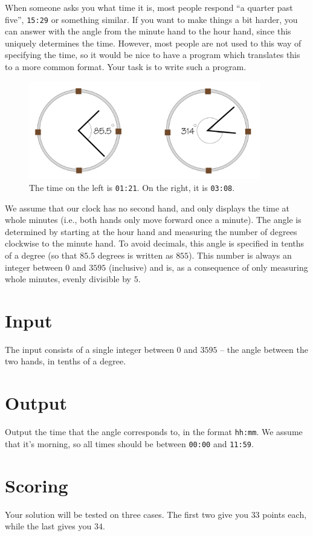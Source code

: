 When someone asks you what time it is, most people respond ``a quarter past five'', \texttt{15:29} or something similar.
If you want to make things a bit harder, you can answer with the angle from the minute hand to the hour hand, since this uniquely determines the time.
However, most people are not used to this way of specifying the time, so it would be nice to have a program which translates this to a more common format.
Your task is to write such a program.

\begin{figure}[h]
\includegraphics[width=0.9\textwidth]{fig.png}
    \caption{The time on the left is \texttt{01:21}. On the right, it is \texttt{03:08}.}
\end{figure}

We assume that our clock has no second hand, and only displays the time at whole minutes (i.e., both hands only move forward once a minute).
The angle is determined by starting at the hour hand and measuring the number of degrees clockwise to the minute hand.
To avoid decimals, this angle is specified in tenths of a degree (so that $85.5$ degrees is written as $855$).
This number is always an integer between $0$ and $3595$ (inclusive) and is, as a consequence of only measuring whole minutes, evenly divisible by $5$.

\section*{Input}
The input consists of a single integer between $0$ and $3595$ -- the angle between the two hands, in tenths of a degree. 

\section*{Output}
Output the time that the angle corresponds to, in the format \texttt{hh:mm}.
We assume that it's morning, so all times should be between \texttt{00:00} and \texttt{11:59}.

\section*{Scoring}
Your solution will be tested on three cases.
The first two give you $33$ points each, while the last gives you $34$.
